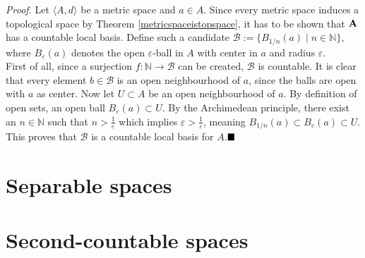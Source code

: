
\textit{Proof.}
Let $\langle A,d\rangle$ be a metric space and $a\in A$. Since every metric space induces a topological space by Theorem \ref{metricspaceistopspace}, it has to be shown that ${\bf A}$ has a countable local basis. Define such a candidate $\mathcal{B}:=\{B_{1/n}(a)\mid n\in\mathbb{N}\}$, where $B_\varepsilon(a)$ denotes the open $\varepsilon$-ball in $A$ with center in $a$ and radius $\varepsilon$.\\

First of all, since a surjection $f:\mathbb{N}\to\mathcal{B}$ can be created, $\mathcal{B}$ is countable. It is clear that every element $b\in\mathcal{B}$ is an open neighbourhood of $a$, since the balls are open with $a$ as center. Now let $U\subset A$ be an open neighbourhood of $a$. By definition of open sets, an open ball $B_\varepsilon(a)\subset U$. By the Archimedean principle, there exist an $n\in\mathbb{N}$ such that $n>\frac{1}{\varepsilon}$ which implies $\varepsilon>\frac{1}{\varepsilon}$, meaning $B_{1/n}(a)\subset B_\varepsilon(a) \subset U$. This proves that $\mathcal{B}$ is a countable local basis for $A$.$\qed$\\

\section{Separable spaces}

\section{Second-countable spaces}

